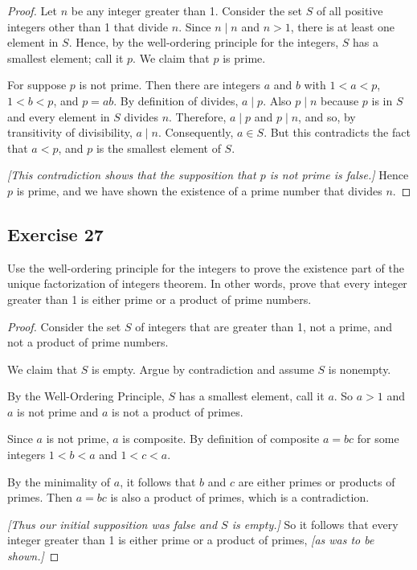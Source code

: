 \documentclass[14pt]{extarticle}
\begin{document}
\begin{proof}
    Let $n$ be any integer greater than 1. Consider the set $S$ of all positive integers other than 1 that divide $n$.
    Since $n \mid n$ and $n > 1$, there is at least one element in $S$. Hence, by the well-ordering principle for the
    integers, $S$ has a smallest element; call it $p$. We claim that $p$ is prime.

    For suppose $p$ is not prime. Then there are integers $a$ and $b$ with $1 < a < p$, $1 < b < p$, and $p = ab$. By
    definition of divides, $a \mid p$. Also $p \mid n$ because $p$ is in $S$ and every element in $S$ divides $n$.
    Therefore, $a \mid p$ and $p \mid n$, and so, by transitivity of divisibility, $a \mid n$. Consequently, $a
        \in S$. But this contradicts the fact that $a < p$, and $p$ is the smallest element of $S$.

        {\it [This contradiction  shows that the supposition that $p$ is not prime is false.]} Hence $p$ is prime, and we
    have shown the existence of a prime number that divides $n$.
\end{proof}

\subsection{Exercise 27}
Use the well-ordering principle for the integers to prove the existence part of the unique factorization of integers theorem. In other words, prove that every integer greater than 1 is either prime or a product of prime numbers.

\begin{proof}
    Consider the set $S$ of integers that are greater than 1, not a prime, and not a product of prime numbers.

    We claim that $S$ is empty. Argue by contradiction and assume $S$ is nonempty.

    By the Well-Ordering Principle, $S$ has a smallest element, call it $a$.
    So $a > 1$ and $a$ is not prime and $a$ is not a product of primes.

    Since $a$ is not prime, $a$ is composite.
    By definition of composite $a = bc$ for some integers $1 < b < a$ and $1 < c < a$.

    By the minimality of $a$, it follows that $b$ and $c$ are either primes or products of primes. Then $a = bc$ is also
    a product of primes, which is a contradiction.

        {\it [Thus our initial supposition was false and $S$ is empty.]} So it follows that every integer greater than 1 is
    either prime or a product of primes, {\it [as was to be shown.]}
\end{proof}
\end{document}
